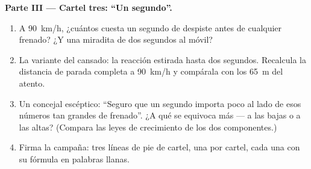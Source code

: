 \begin{problem}
\medskip\noindent\textbf{Parte III --- Cartel tres: ``Un segundo''.}
\begin{enumerate}[resume]
  \item A \qty{90}{km/h}, ¿cuántos  cuesta un segundo de
        despiste antes de cualquier frenado? ¿Y una miradita de dos
        segundos al móvil?
  \item La variante del  cansado: la reacción estirada
        hasta dos segundos. Recalcula la distancia de parada
        completa a \qty{90}{km/h} y compárala con los \qty{65}{m}
        del  atento.
  \item Un concejal escéptico: ``Seguro que un segundo importa poco
        al lado de esos números tan grandes de frenado''. ¿A qué
         se equivoca más --- a las bajas o a las
        altas? (Compara las leyes de crecimiento de los dos
        componentes.)
  \item Firma la campaña: tres líneas de pie de cartel, una por
        cartel, cada una con su fórmula en palabras llanas.
\end{enumerate}
\end{problem}
